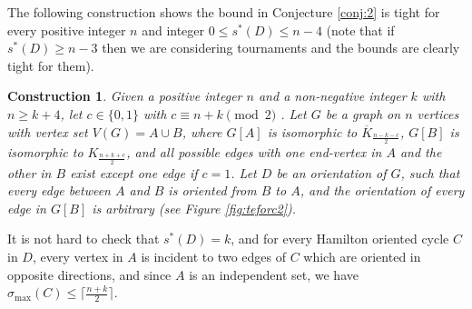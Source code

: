 \documentclass[11pt]{article}
\newtheorem{construction}[theorem]{Construction}
\newcommand{\QGr}[1]{{#1}}
\newcommand{\QG}[1]{{#1}}
\newcommand{\YLn}[1]{{#1}}
\newcommand{\2}{\vspace{0.2cm}}
\begin{document}
     The following \YLn{construction shows} the bound in Conjecture \ref{conj:2} is tight for every positive integer $n$ and integer $0\le s^*(D) \le n-4$ (note that if $ s^*(D)\ge n-3$ then we are considering tournaments and the bounds are clearly tight for them).
   \QG{\begin{construction}
        Given a positive integer $n$ and a non-negative integer $k$ with  $n\ge k+4$, let \QGr{$c \in \{0, 1\}$ with $c\equiv n+k \pmod{2}$} . Let $G$ be a graph on $n$ vertices with vertex set $V(G)=A\cup B$, where $G[A]$ is isomorphic to \QGr{$\overline{K}_{\frac{n-k-c}{2}}$}, $G[B]$ is isomorphic to \QGr{$K_{\frac{n+k+c}{2}} $}, and all possible edges with one end-vertex in $A$ and the other in $B$ exist except \QGr{one edge if $c=1$.} Let $D$ be an orientation of $G$, such that every edge between $A$ and $B$ is oriented from $B$ to $A$, and the orientation of every edge in $G[B]$ is arbitrary (see Figure \ref{fig:teforc2}).
   \end{construction}}

        It is not hard to check that $s^*(D)=k$, and for every Hamilton oriented cycle $C$ in $D$, \QGr{every vertex in $A$ is incident to two edges of $C$ which are oriented in opposite directions, and since $A$ is an independent set,} we have $\sigma_{\max}(C)\leq \lceil\frac{n+k}{2}\rceil$.
	
\end{document}
